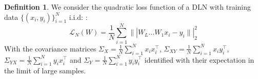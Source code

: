 \documentclass{article}
\theoremstyle{definition}
\newtheorem{definition}[theorem]{Definition}
\begin{document}

\begin{definition}
We consider the quadratic loss function of a DLN with training data $\{(x_i,y_i)\}_{i=1}^N$ i.i.d: :
    \begin{equation*}
        \mathcal{L}_N(W) = \frac{1}{N}\sum_{i=1}^N \||W_L...W_1 x_i - y_i\||_2^2
    \end{equation*}
With the covariance matrices $\Sigma_X = \frac{1}{N}\sum_{i=1}^N x_i x_i^\top$, $\Sigma_{XY} = \frac{1}{N}\sum_{i=1}^N x_i y_i^\top$, $\Sigma_{YX} = \frac{1}{N}\sum_{i=1}^N y_i x_i^\top$ and $\Sigma_Y = \frac{1}{N}\sum_{i=1}^N y_i y_i^\top$ identified with their expectation in the limit of large samples.
\end{definition}
\end{document}
